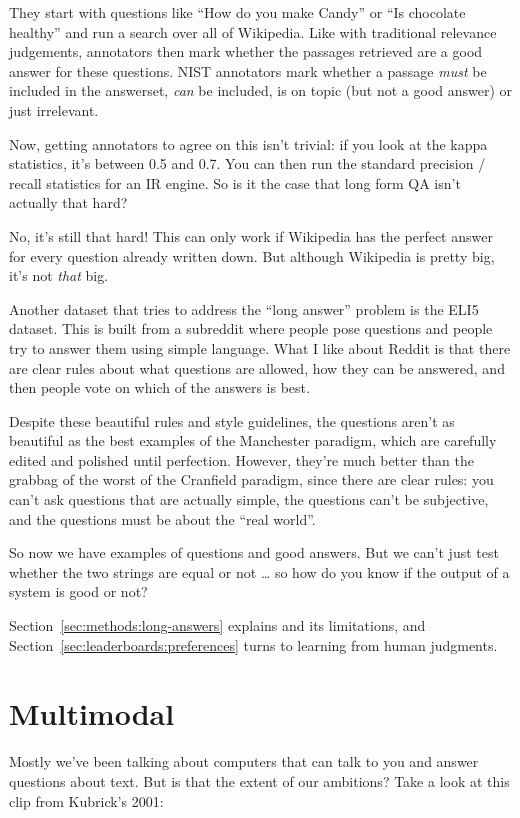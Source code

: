 They start with questions like “How do you make Candy” or “Is chocolate healthy” and run a search over all of Wikipedia.  Like with traditional relevance judgements, annotators then mark whether the passages retrieved are a good answer for these questions.  NIST annotators mark whether a passage \emph{must} be included in the answerset, \emph{can} be included, is on topic (but not a good answer) or just irrelevant.

Now, getting annotators to agree on this isn’t trivial: if you look at the kappa statistics, it’s between 0.5 and 0.7.  You can then run the standard precision / recall statistics for an IR engine.  So is it the case that long form QA isn’t actually that hard?

No, it’s still that hard!  This can only work if Wikipedia has the perfect answer for every question already written down.  But although Wikipedia is pretty big, it’s not \emph{that} big.

Another dataset that tries to address the “long answer” problem is the ELI5 dataset.  This is built from a subreddit where people pose questions and people try to answer them using simple language.  What I like about Reddit is that there are clear rules about what questions are allowed, how they can be answered, and then people vote on which of the answers is best.

Despite these beautiful rules and style guidelines, the questions aren’t as beautiful as the best examples of the Manchester paradigm, which are carefully edited and polished until perfection.  However, they’re much better than the grabbag of the worst of the Cranfield paradigm, since there are clear rules: you can’t ask questions that are actually simple, the questions can’t be subjective, and the questions must be about the “real world”.

So now we have examples of questions and good answers.  But we can’t just test whether the two strings are equal or not … so how do you know if the output of a system is good or not?

Section~\ref{sec:methods:long-answers} explains  and its limitations, and Section~\ref{sec:leaderboards:preferences} turns to learning from human judgments.

\section{Multimodal}
\label{sec:formats:multimodal}

Mostly we’ve been talking about computers that can talk to you and answer questions about text.  But is that the extent of our ambitions?  Take a look at this clip from Kubrick’s 2001:

